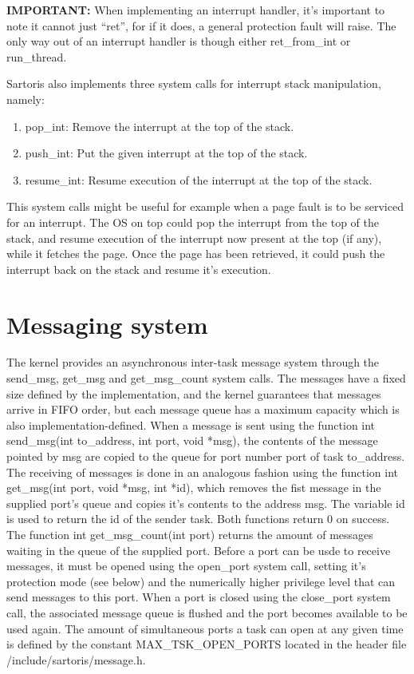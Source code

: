 \documentclass[11pt, letterpaper, twoside, english]{book}
\begin{document}
\textbf{IMPORTANT:} When implementing an interrupt handler, it's important to note it cannot just "`ret"', for if it does, a general protection fault will raise. The only way out of an interrupt handler is though either \textsf{ret\_from\_int} or \textsf{run\_thread}.
       
Sartoris also implements three system calls for interrupt stack manipulation, namely:

\begin{enumerate}
\item[]\textsf{pop\_int}: Remove the interrupt at the top of the stack.
\item[]\textsf{push\_int}: Put the given interrupt at the top of the stack.
\item[]\textsf{resume\_int}: Resume execution of the interrupt at the top of the stack.
\end{enumerate}

This system calls might be useful for example when a page fault is to be serviced for an interrupt. The OS on top could pop the interrupt from the top of the stack, and resume execution of the interrupt now present at the top (if any), while it fetches the page. Once the page has been retrieved, it could push the interrupt back on the stack and resume it's execution.

\section{Messaging system}
The kernel provides an asynchronous inter-task message system through the \textsf{send\_msg}, \textsf{get\_msg} and \textsf{get\_msg\_count} system calls. The messages have a fixed size defined by the implementation, and the kernel guarantees that messages arrive in FIFO order, but each message queue has a maximum capacity which is also implementation-defined. When a message is sent using the function \textsf{int send\_msg(int to\_address, int port, void *msg)}, the contents of the message pointed by \textsf{msg} are copied to the queue for port number \textsf{port} of task \textsf{to\_address}. The receiving of messages is done in an analogous fashion using the function \textsf{int get\_msg(int port, void *msg, int *id)}, which removes the fist message in the supplied \textsf{port}'s queue and copies it's contents to the address \textsf{msg}. The variable \textsf{id} is used to return the id of the sender task. Both functions return 0 on success. 
The function \textsf{int get\_msg\_count(int port)} returns the amount of messages waiting in the queue of the supplied port.
Before a port can be usde to receive messages, it must be opened using the \textsf{open\_port} system call, setting it's protection mode (see below) and the numerically higher privilege level that can send messages to this port. When a port is closed using the \textsf{close\_port} system call, the associated message queue is flushed and the port becomes available to be used again. The amount of simultaneous ports a task can open at any given time is defined by the constant \textsf{MAX\_TSK\_OPEN\_PORTS} located in the header file \textsf{/include/sartoris/message.h}. 
\end{document}
